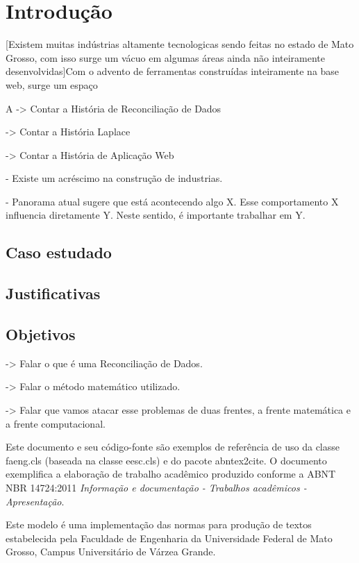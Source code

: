 \chapter[Introdução]{Introdução}

[Existem muitas indústrias altamente tecnologicas sendo feitas no estado de Mato Grosso, com isso surge um vácuo em algumas áreas ainda não inteiramente desenvolvidas]Com o advento de ferramentas construídas inteiramente na base web, surge um espaço

A 
-> Contar a História de Reconciliação de Dados

-> Contar a História Laplace

-> Contar a História de Aplicação Web

- Existe um acréscimo na construção de industrias.


- Panorama atual sugere que está acontecendo algo X. Esse comportamento X influencia diretamente Y. Neste sentido, é importante trabalhar em Y.


\section{Caso estudado}


\section{Justificativas}


\section{Objetivos}

-> Falar o que é uma Reconciliação de Dados.

-> Falar o método matemático utilizado.

-> Falar que vamos atacar esse problemas de duas frentes, a frente matemática e a frente computacional.

Este documento e seu código-fonte são exemplos de referência de uso da classe \textsf{faeng.cls} (baseada na classe \textsf{eesc.cls}) e do pacote \textsf{abntex2cite}. O documento exemplifica a elaboração de trabalho acadêmico produzido conforme a \ac{ABNT} \ac{NBR} 14724:2011 \emph{Informação e documentação - Trabalhos acadêmicos - Apresentação}.

Este modelo é uma implementação das normas para produção de textos estabelecida pela Faculdade de Engenharia da Universidade Federal de Mato Grosso, Campus Universitário de Várzea Grande.